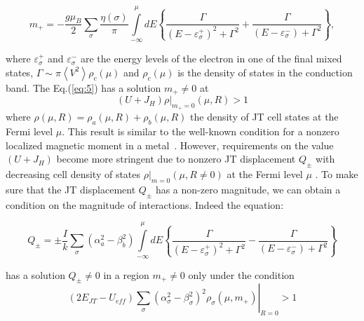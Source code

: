 \documentclass[%
 reprint,
groupedaddress,
 amsmath,amssymb,
 aps,
prb,
]{revtex4-1}
\begin{document}
\begin{widetext}
\begin{equation}
m_ +   =  - \frac{{g\mu _B }}{2}\sum\limits_\sigma  {\frac{{\eta \left( \sigma  \right)}}{\pi }\int\limits_{ - \infty }^\mu  {dE\left\{ {\frac{\Gamma }{{\left( {E - \varepsilon _\sigma ^ +  } \right)^2  + \Gamma ^2 }} + \frac{\Gamma }{{\left( {E - \varepsilon _\sigma ^ -  } \right) + \Gamma ^2 }}} \right\}} },
\label{eq:5}
\end{equation}
\end{widetext}
where $\varepsilon _\sigma ^ +$ and $\varepsilon _\sigma ^ -$ are the energy levels of the electron in one of the final mixed states, $\Gamma  \sim \pi \left\langle {V^2 } \right\rangle \rho _c \left( \mu  \right)$ and $\rho _c \left( \mu  \right)$ is the density of states in the conduction band. The Eq.(\ref{eq:5}) has a solution $m_{+} \ne 0$  at
\begin{equation}
\left( {U + J_H } \right)\left. \rho  \right|_{m_+ = 0} \left( {\mu ,R} \right) > 1
\label{eq:6}
\end{equation}
where  $\rho \left( {\mu ,R} \right) = \rho _a \left( {\mu ,R} \right) + \rho _b \left( {\mu ,R} \right)$  the density of JT cell states at the Fermi level $\mu$. This result is similar to the well-known condition for a nonzero localized magnetic moment in a metal~\cite{Anderson1961}. However, requirements on the value $\left( {U + J_H } \right)$ become more stringent due to nonzero JT displacement $Q_ \pm$ with decreasing cell density of states $\left. \rho  \right|_{m = 0} \left( {\mu ,R\neq 0} \right)$ at the Fermi level $\mu$ . To make sure that the JT displacement $Q_ \pm$  has a non-zero magnitude, we can obtain a condition on the magnitude of interactions. Indeed the equation:
\begin{widetext}
\begin{equation}
Q_ \pm   =  \pm \frac{I}{k}\sum\limits_\sigma  {\left( {\alpha _a^2  - \beta _b^2 } \right)\int\limits_{ - \infty }^\mu  {dE\left\{ {\frac{\Gamma }{{\left( {E - \varepsilon _\sigma ^ +  } \right)^2  + \Gamma ^2 }} - \frac{\Gamma }{{\left( {E - \varepsilon _\sigma ^ -  } \right) + \Gamma ^2 }}} \right\}} }
\label{eq:7}
\end{equation}
\end{widetext}
has a solution $Q_ \pm   \ne 0$ in a region $m_ +   \ne 0$ only under the condition
\begin{equation}
\left( {2E_{JT}  - U_{eff} } \right)\left. {\sum\limits_\sigma  {\left( {\alpha _\sigma ^2  - \beta _\sigma ^2 } \right)^2 \rho _\sigma ^{} \left( {\mu ,m_ +  } \right)} } \right|_{R = 0}  > 1
\label{eq:8}
\end{equation}
\end{document}
